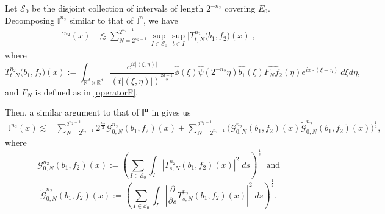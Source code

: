 \documentclass[a4paper,reqno]{amsart}
\numberwithin{equation}{section}
\newcommand{\R}{{\mathbb {R}}}
\begin{document}
	Let $\mathcal{E}_0$ be the disjoint collection of intervals of length $2^{-n_2}$ covering $E_0$. Decomposing $\mathbb{I}^{n_2}$ similar to that of $\mathbb{I}^{\mathbf{n}}$, we have
	\begin{align*}
		\mathbb{I}^{n_2}(x)&\lesssim\sum_{N=2^{n_2-1}}^{2^{n_2+1}}\sup_{I\in\mathcal{E}_0}\sup_{t\in I}\Big|T^{n_2}_{t,N}\Big(b_1,f_2\Big)(x) \Big|,
	\end{align*}
	where
	\[T^{n_2}_{t,N}\Big(b_1,f_2\Big)(x):=\int_{\R^d\times\R^d}\frac{e^{it|(\xi,\eta)|}}{(t|(\xi,\eta)|)^{\frac{2d-1}{2}}}\widehat{\phi}\left( \xi\right)\widehat{\psi}\left(2^{-n_2} \eta\right)\widehat{b_1}(\xi)\widehat{F_Nf_2}(\eta)e^{ix\cdot(\xi+\eta)}~d\xi d\eta,\]    
	and $F_N$ is defined as in \eqref{operatorF}.
	
	Then, a similar argument to that of $\mathbb{I}^{\mathbf{n}}$ in  gives us
	\begin{align*}\label{localdeco2}
		\mathbb{I}^{n_2}(x)\lesssim&\sum_{N=2^{n_2-1}}^{2^{n_2+1}}2^{\frac{n_2}{2}}\mathcal{G}^{n_2}_{0,N}(b_1,f_2)(x)+\sum_{N=2^{n_2-1}}^{2^{n_2+1}}\big(\mathcal{G}^{n_2}_{0,N}(b_1,f_2)(x)\tilde{\mathcal{G}}^{n_2}_{0,N}(b_1,f_2)(x)\big)^{\frac{1}{2}},
	\end{align*}
	where
	\[\mathcal{G}^{n_2}_{0,N}(b_1,f_2)(x):=\left(\sum_{I\in \mathcal{E}_0}\int_I|T^{n_2}_{s,N}(b_1,f_2)(x)|^2\;ds\right)^\frac{1}{2}~\text{ and}\]
	\[\tilde{\mathcal{G}}^{n_2}_{0,N}(b_1,f_2)(x):=\left(\sum_{I\in \mathcal{E}_0}\int_I\left|\frac{\partial}{\partial s}T^{n_2}_{s,N}(b_1,f_2)(x)\right|^2\;ds\right)^\frac{1}{2}.\]
	
\end{document}
